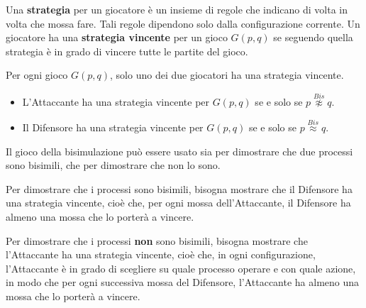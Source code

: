 Una \textbf{strategia} per un giocatore è un insieme di regole che indicano di
volta in volta che mossa fare. Tali regole dipendono solo dalla configurazione
corrente. Un giocatore ha una \textbf{strategia vincente} per un gioco $G(p, q)$
se seguendo quella strategia è in grado di vincere tutte le partite del gioco.
\begin{teorema}
    Per ogni gioco $G(p, q)$, solo uno dei due giocatori ha una strategia vincente.
    \begin{itemize}
        \item L'Attaccante ha una strategia vincente per $G(p, q)$ se e solo se
              $p \stackrel{Bis}{\not\approx} q$.
        \item Il Difensore ha una strategia vincente per $G(p, q)$ se e solo se
              $p \stackrel{Bis}{\approx} q$.
    \end{itemize}
\end{teorema}
\begin{nota}
    Il gioco della bisimulazione può essere usato sia per dimostrare che due
    processi sono bisimili, che per dimostrare che non lo sono.
\end{nota}
Per dimostrare che i processi sono bisimili, bisogna mostrare che il Difensore
ha una strategia vincente, cioè che, per ogni mossa dell'Attaccante, il Difensore
ha almeno una mossa che lo porterà a vincere.

Per dimostrare che i processi \textbf{non} sono bisimili, bisogna mostrare che
l'Attaccante ha una strategia vincente, cioè che, in ogni configurazione,
l'Attaccante è in grado di scegliere su quale processo operare e con quale azione,
in modo che per ogni successiva mossa del Difensore, l'Attaccante ha almeno una
mossa che lo porterà a vincere.